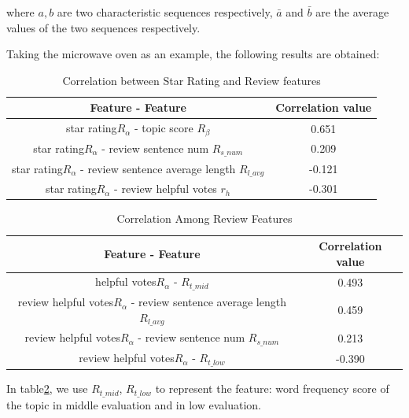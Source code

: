 \documentclass{mcmthesis}
\begin{document}
where $a,b$ are two characteristic sequences respectively, ${\bar{a}}$ and ${\bar{b}}$ are the average values of the two sequences respectively.

Taking the microwave oven as an example, the following results are obtained:
\begin{table}[H]
	\center
	\caption{Correlation between Star Rating and Review features}
	\label{type}
	\begin{tabular}{c|c}
		\hline
		\textbf{Feature - Feature} & \textbf{Correlation value} \\ \hline
		star rating$R_{\alpha}$ -  topic score $R_{\beta}$             & 0.651                    \\ 
		star rating$R_{\alpha}$ -  review sentence num  $R_{s\_{num}}$              & 0.209                     \\ 
		star rating$R_{\alpha}$ -  review sentence average length  $R_{l\_{avg}}$              & -0.121                     \\ 
		star rating$R_{\alpha}$ -  review helpful votes  $r_{h}$                & -0.301 	\\ \hline
	\end{tabular}
\end{table}

\begin{table}[H]
	\center
	\caption{Correlation Among Review Features}
	\label{type}
	\begin{tabular}{c|c}
		\hline
		\textbf{Feature - Feature} & \textbf{Correlation value} \\ \hline
		helpful votes$R_{\alpha}$ -   $R_{t\_{mid}}$               & 0.493                     \\ 
		review helpful votes$R_{\alpha}$ -  review sentence average length  $R_{l\_{avg}}$             & 0.459                    \\
		review helpful votes$R_{\alpha}$ -  review sentence num  $R_{s\_{num}}$              & 0.213                     \\ 
		review helpful votes$R_{\alpha}$ -  $R_{t\_{low}}$                & -0.390 	\\ \hline
	\end{tabular}
	\label{table2}
\end{table}
In table\ref{table2}, we use $R_{t\_{mid}}$, $R_{t\_{low}}$ to represent the feature: word frequency score of the topic in middle evaluation and in low  evaluation.
\end{document}
